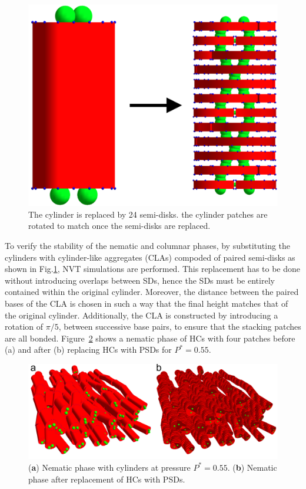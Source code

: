 \documentclass[aip,jcp, amsmath, amssymb, reprint]{revtex4-1}
\begin{document}
\begin{figure}[h!]
\includegraphics[width=0.7\linewidth]{sosti4.png}
\caption{\label{fig:fila} The cylinder is replaced by 24 semi-disks. the cylinder patches are rotated to match once the semi-disks are replaced.}
\end{figure}

To verify the stability of the nematic and columnar phases, by substituting the cylinders with cylinder-like aggregates (CLAs) compoded of paired semi-disks as shown
in Fig.\ref{fig:fila}, NVT simulations are performed. 
This replacement has to be done without introducing overlaps between SDs, hence
the SDs must be entirely contained within the original cylinder. Moreover,
the distance between the paired bases of the CLA
is chosen in such a way that the final 
height matches that of the original cylinder. Additionally, the CLA is constructed by introducing a rotation of $\pi/5$, between successive base
pairs, to ensure that the stacking patches are all bonded. 
Figure~\ref{sosti1} shows a nematic phase of HCs with four patches before (a) and after (b)
replacing HCs with PSDs for $P^*=0.55$. 

\begin{figure}[h!]
\includegraphics[width=0.9\linewidth]{sosti1.png} 
\caption{\label{sosti1} (\textbf{a}) Nematic phase with cylinders at pressure $P^*=0.55$. (\textbf{b}) Nematic phase after replacement of HCs with PSDs. } 
\end{figure} 
\end{document}
